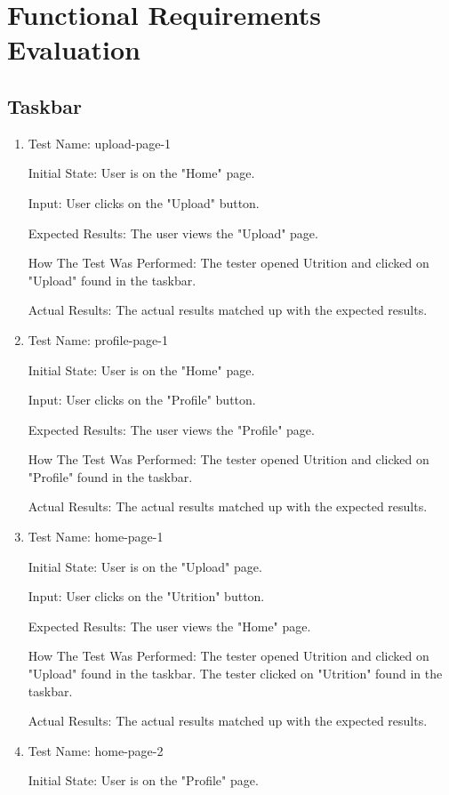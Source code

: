 \documentclass[12pt, titlepage]{article}
\begin{document}
	\section{Functional Requirements Evaluation}
	\subsection{Taskbar}
	\begin{enumerate}
	\item{Test Name: upload-page-1}
	
	Initial State: User is on the "Home" page.
	
	Input: User clicks on the "Upload" button.
	
	Expected Results: The user views the "Upload" page.
	
	How The Test Was Performed: The tester opened Utrition and clicked on "Upload" found in the taskbar.
	
	Actual Results: The actual results matched up with the expected results.
	
	\item{Test Name: profile-page-1}
	
	Initial State: User is on the "Home" page.
	
	Input: User clicks on the "Profile" button.
	
	Expected Results: The user views the "Profile" page.
	
	How The Test Was Performed: The tester opened Utrition and clicked on "Profile" found in the taskbar.
	
	Actual Results: The actual results matched up with the expected results.
	
	\item{Test Name: home-page-1}
	
	Initial State: User is on the "Upload" page.
	
	Input: User clicks on the "Utrition" button.
	
	Expected Results: The user views the "Home" page.
	
	How The Test Was Performed: The tester opened Utrition and clicked on "Upload" found in the taskbar. The tester clicked on "Utrition" found in the taskbar.
	
	Actual Results: The actual results matched up with the expected results.
	
	\item{Test Name: home-page-2}
	
	Initial State: User is on the "Profile" page.
	

\end{enumerate}
\end{document}

